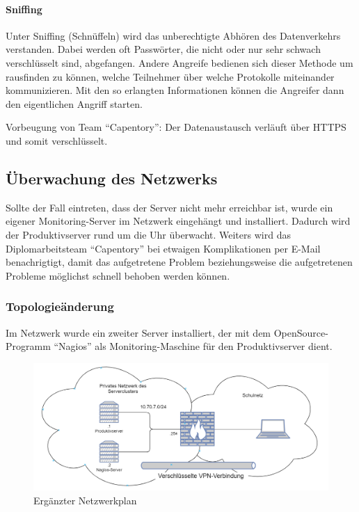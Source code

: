 \hypertarget{sniffing}{%
\paragraph{Sniffing}\label{sniffing}}

Unter Sniffing (Schnüffeln) wird das unberechtigte Abhören des
Datenverkehrs verstanden. Dabei werden oft Passwörter, die nicht oder
nur sehr schwach verschlüsselt sind, abgefangen. Andere Angreife
bedienen sich dieser Methode um rausfinden zu können, welche Teilnehmer
über welche Protokolle miteinander kommunizieren. Mit den so erlangten
Informationen können die Angreifer dann den eigentlichen Angriff
starten.

Vorbeugung von Team ``Capentory'': Der Datenaustausch verläuft über
HTTPS und somit verschlüsselt.

\hypertarget{uxfcberwachung-des-netzwerks}{%
\subsection{Überwachung des
Netzwerks}\label{uxfcberwachung-des-netzwerks}}

Sollte der Fall eintreten, dass der Server nicht mehr erreichbar ist,
wurde ein eigener Monitoring-Server im Netzwerk eingehängt und
installiert. Dadurch wird der Produktivserver rund um die Uhr überwacht.
Weiters wird das Diplomarbeitsteam ``Capentory'' bei etwaigen
Komplikationen per E-Mail benachrigtigt, damit das aufgetretene Problem
beziehungsweise die aufgetretenen Probleme möglichst schnell behoben
werden können.

\hypertarget{topologieuxe4nderung}{%
\subsubsection{Topologieänderung}\label{topologieuxe4nderung}}

Im Netzwerk wurde ein zweiter Server installiert, der mit dem
OpenSource-Programm ``Nagios'' als Monitoring-Maschine für den
Produktivserver dient.

\begin{figure}[ht]
\centering
\includegraphics{neutopo.png}
\caption{Ergänzter Netzwerkplan}
\end{figure}

